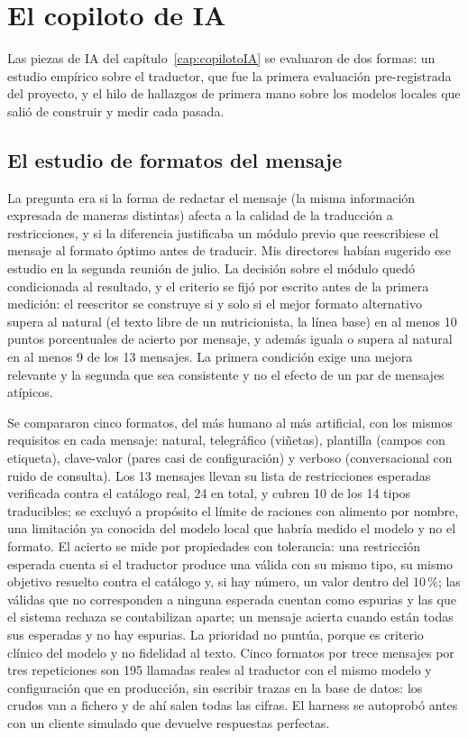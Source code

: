 \section{El copiloto de IA}
\label{sec:evalCopiloto}

Las piezas de IA del capítulo~\ref{cap:copilotoIA} se evaluaron de dos formas: un estudio empírico sobre el traductor, que fue la primera evaluación pre-registrada del proyecto, y el hilo de hallazgos de primera mano sobre los modelos locales que salió de construir y medir cada pasada.

\subsection{El estudio de formatos del mensaje}
\label{sec:evalFormatos}

La pregunta era si la forma de redactar el mensaje (la misma información expresada de maneras distintas) afecta a la calidad de la traducción a restricciones, y si la diferencia justificaba un módulo previo que reescribiese el mensaje al formato óptimo antes de traducir. Mis directores habían sugerido ese estudio en la segunda reunión de julio. La decisión sobre el módulo quedó condicionada al resultado, y el criterio se fijó por escrito antes de la primera medición: el reescritor se construye si y solo si el mejor formato alternativo supera al natural (el texto libre de un nutricionista, la línea base) en al menos 10 puntos porcentuales de acierto por mensaje, y además iguala o supera al natural en al menos 9 de los 13 mensajes. La primera condición exige una mejora relevante y la segunda que sea consistente y no el efecto de un par de mensajes atípicos.

Se compararon cinco formatos, del más humano al más artificial, con los mismos requisitos en cada mensaje: natural, telegráfico (viñetas), plantilla (campos con etiqueta), clave-valor (pares casi de configuración) y verboso (conversacional con ruido de consulta). Los 13 mensajes llevan su lista de restricciones esperadas verificada contra el catálogo real, 24 en total, y cubren 10 de los 14 tipos traducibles; se excluyó a propósito el límite de raciones con alimento por nombre, una limitación ya conocida del modelo local que habría medido el modelo y no el formato. El acierto se mide por propiedades con tolerancia: una restricción esperada cuenta si el traductor produce una válida con su mismo tipo, su mismo objetivo resuelto contra el catálogo y, si hay número, un valor dentro del 10\,\%; las válidas que no corresponden a ninguna esperada cuentan como espurias y las que el sistema rechaza se contabilizan aparte; un mensaje acierta cuando están todas sus esperadas y no hay espurias. La prioridad no puntúa, porque es criterio clínico del modelo y no fidelidad al texto. Cinco formatos por trece mensajes por tres repeticiones son 195 llamadas reales al traductor con el mismo modelo y configuración que en producción, sin escribir trazas en la base de datos: los crudos van a fichero y de ahí salen todas las cifras. El harness se autoprobó antes con un cliente simulado que devuelve respuestas perfectas.

